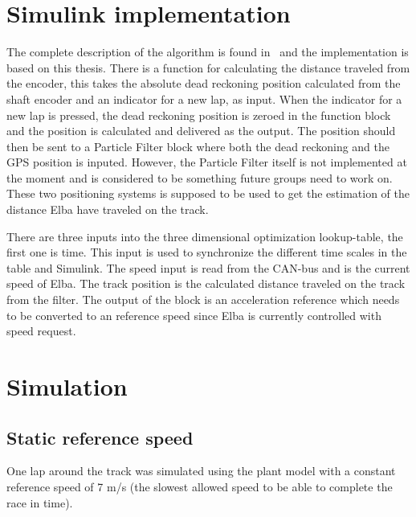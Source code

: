 \section{Simulink implementation}
The complete description of the algorithm is found in~\cite{liu2016} and the
implementation is based on this thesis.  There is a function for calculating the
distance traveled from the encoder, this takes the absolute dead reckoning
position calculated from the shaft encoder and an indicator for a new lap, as
input. When the indicator for a new lap is pressed, the dead reckoning position
is zeroed in the function block and the position is calculated and delivered as
the output. The position should then be sent to a Particle Filter block where
both the dead reckoning and the GPS position is inputed.  However, the Particle
Filter itself is not implemented at the moment and is considered to be something
future groups need to work on. These two positioning systems is supposed to be
used to get the estimation of the distance Elba have traveled on the track.

There are three inputs into the three dimensional optimization lookup-table, the
first one is time. This input is used to synchronize the different time scales
in the table and Simulink. The speed input is read from the CAN-bus and is the
current speed of Elba. The track position is the calculated distance traveled
on the track from the filter. The output of the block is an acceleration
reference which needs to be converted to an reference speed since Elba is
currently controlled with speed request. 

\section{Simulation}

\subsection{Static reference speed}\label{sec:opt_sim_static}
One lap around the track was simulated using the plant model with a constant reference speed of 7 m/s (the slowest allowed speed to be able to complete the race in time). %


